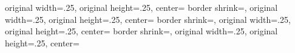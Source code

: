 {{	original width=.25\pgfpageoptionheight,%
	original height=.25\pgfpageoptionwidth,%
	center=\pgfpoint{.75\pgfphysicalwidth}{.25\pgfphysicalheight}%
  }%
  {%
	border shrink=\pgfpageoptionborder,%
	original width=.25\pgfpageoptionheight,%
	original height=.25\pgfpageoptionwidth,%
	center=\pgfpoint{.5\pgfphysicalwidth}{.25\pgfphysicalheight}%
  }%
  {%
	border shrink=\pgfpageoptionborder,%
	original width=.25\pgfpageoptionheight,%
	original height=.25\pgfpageoptionwidth,%
	center=\pgfpoint{.25\pgfphysicalwidth}{.25\pgfphysicalheight}%
  }%
  {%
	border shrink=\pgfpageoptionborder,%
	original width=.25\pgfpageoptionheight,%
	original height=.25\pgfpageoptionwidth,%
	center=\pgfpoint{0\pgfphysicalwidth}{.25\pgfphysicalheight}%
  }%
}%